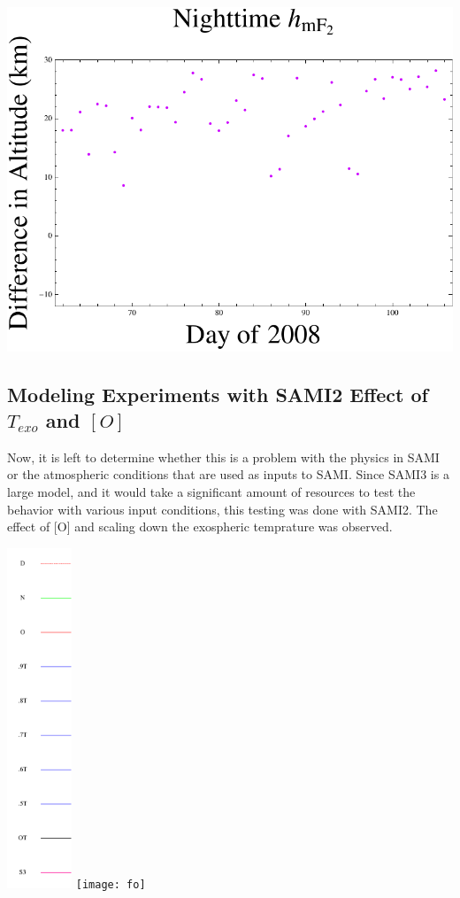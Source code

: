 \documentclass[12pt]{article}
\begin{document}
  \includegraphics[width=.75\textwidth]{nighth}
    \clearpage
 
\subsection{Modeling Experiments with SAMI2 {Effect of $T_{exo}$ and $\left[O\right]$}}
Now, it is left to determine whether this is a problem with the physics in SAMI or the atmospheric conditions that are used as inputs to SAMI. Since SAMI3 is a large model, and it would take a significant amount of resources to test the behavior with various input conditions, this testing was done with SAMI2. The effect of [O] and scaling down the exospheric temprature was observed.

  \includegraphics[height=4in]{legend}
  \texttt{[image: fo]}
\clearpage
\end{document}
